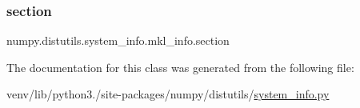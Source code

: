 \mbox{\label{classnumpy_1_1distutils_1_1system__info_1_1mkl__info_aa22392ecb88c54f363c3edd1e256794c}} 
\subsubsection{\texorpdfstring{section}{section}}
{\footnotesize\ttfamily numpy.\+distutils.\+system\+\_\+info.\+mkl\+\_\+info.\+section\hspace{0.3cm}{\ttfamily [static]}}



The documentation for this class was generated from the following file\+:\begin{DoxyCompactItemize}
\item 
venv/lib/python3./site-\/packages/numpy/distutils/\hyperlink{system__info_8py}{system\+\_\+info.\+py}\end{DoxyCompactItemize}
